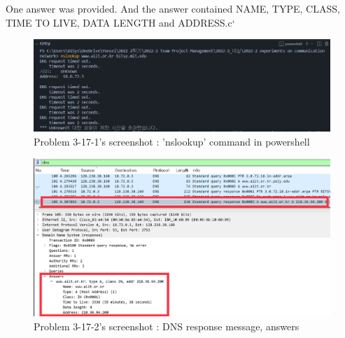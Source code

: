 \begin{enumerate}[label=\bfseries Problem \arabic*:,leftmargin=*,labelindent=1em]
            One answer was provided. And the answer contained NAME, TYPE, CLASS, TIME TO LIVE, DATA LENGTH and ADDRESS.c`
            \vspace{-2mm}  
            \begin{figure}[!h]\centering
        		\includegraphics[width=.78\textwidth]{image/result_week01/Q3-h-1.png}
        		\caption{\footnotesize Problem 3-17-1's screenshot : 'nslookup' command in powershell}
        		\vspace{-10pt}
            \end{figure}
            \begin{figure}[!h]\centering
        		\includegraphics[width=.79\textwidth]{image/result_week01/Q3-h-2.png}
        		\caption{\footnotesize Problem 3-17-2's screenshot : DNS response message, answers}
        		\vspace{-10pt}
            \end{figure}

    \end{enumerate}